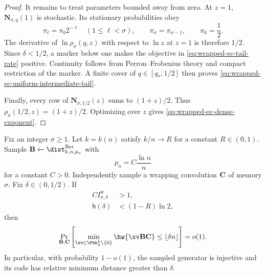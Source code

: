 \begin{proof}
It remains to treat parameters bounded away from zero.  At $z=1$,
$\mathbf N_{\sigma,q}(1)$ is stochastic.  Its stationary probabilities obey
\begin{equation}
 \pi_\ell=\pi_0 2^{-\ell}\quad(1\leq\ell<\sigma),
 \qquad
 \pi_\sigma=\pi_{\sigma-1},
 \qquad
 \pi_0=\frac12.
 \label{eq:wrapped-ec-stationary-law}
\end{equation}
The derivative of $\ln\rho_\sigma(q,z)$ with respect to $\ln z$ at $z=1$ is
therefore $1/2$.  Since $\delta<1/2$, a marker below one makes the objective
in \eqref{eq:wrapped-ec-tail-rate} positive.  Continuity follows from
Perron--Frobenius theory and compact restriction of the marker.  A finite
cover of $q\in[q_*,1/2]$ then proves
\eqref{eq:wrapped-ec-uniform-intermediate-tail}.

Finally, every row of $\mathbf N_{\sigma,1/2}(z)$ sums to $(1+z)/2$.
Thus $\rho_\sigma(1/2,z)=(1+z)/2$.  Optimizing over $z$ gives
\eqref{eq:wrapped-ec-dense-exponent}.
\end{proof}

\begin{theorem}
\label{thm:wrapped-ec-linear-distance}
Fix an integer $\sigma\geq1$.  Let $k=k(n)$ satisfy $k/n\to R$ for a constant
$R\in(0,1)$.  Sample $\B\gets\dist^{\mathrm{Ber}}_{k,n,p_n}$ with
\begin{equation}
 p_n=C\frac{\ln n}{n}
 \label{eq:wrapped-ec-density}
\end{equation}
for a constant $C>0$.  Independently sample a wrapping convolution $\mathbf C$ of
memory $\sigma$.  Fix $\delta\in(0,1/2)$.  If
\begin{align}
 C I^{\mathrm{w}}_{\sigma,\delta}&>1,
 \label{eq:wrapped-ec-sparse-condition}\\
 \mathsf{h}(\delta)&<(1-R)\ln2,
 \label{eq:wrapped-ec-gv-condition}
\end{align}
then
\begin{equation}
 \Pr_{\B,\C}\left[
  \min_{\xv\in\Fbb_2^k\setminus\{0\}}
  \hw{\xv\B\C}\leq\lfloor\delta n\rfloor
 \right]=o(1).
 \label{eq:wrapped-ec-linear-distance-conclusion}
\end{equation}
In particular, with probability $1-o(1)$, the sampled generator is injective
and its code has relative minimum distance greater than $\delta$.
\end{theorem}

